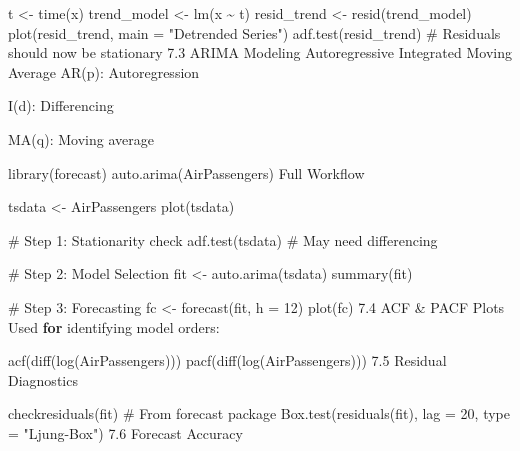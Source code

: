 \documentclass[
  letterpaper,
  DIV=11,
  numbers=noendperiod]{scrreprt}
\newenvironment{Shaded}{\begin{snugshade}}{\end{snugshade}}
\newcommand{\AttributeTok}[1]{\textcolor[rgb]{0.40,0.45,0.13}{#1}}
\newcommand{\CommentTok}[1]{\textcolor[rgb]{0.37,0.37,0.37}{#1}}
\newcommand{\ControlFlowTok}[1]{\textcolor[rgb]{0.00,0.23,0.31}{\textbf{#1}}}
\newcommand{\DecValTok}[1]{\textcolor[rgb]{0.68,0.00,0.00}{#1}}
\newcommand{\FloatTok}[1]{\textcolor[rgb]{0.68,0.00,0.00}{#1}}
\newcommand{\FunctionTok}[1]{\textcolor[rgb]{0.28,0.35,0.67}{#1}}
\newcommand{\NormalTok}[1]{\textcolor[rgb]{0.00,0.23,0.31}{#1}}
\newcommand{\OtherTok}[1]{\textcolor[rgb]{0.00,0.23,0.31}{#1}}
\newcommand{\SpecialCharTok}[1]{\textcolor[rgb]{0.37,0.37,0.37}{#1}}
\newcommand{\StringTok}[1]{\textcolor[rgb]{0.13,0.47,0.30}{#1}}
\begin{document}
{\begin{Shaded}
\begin{Highlighting}[]
\NormalTok{t }\OtherTok{\textless{}{-}} \FunctionTok{time}\NormalTok{(x)}
\NormalTok{trend\_model }\OtherTok{\textless{}{-}} \FunctionTok{lm}\NormalTok{(x }\SpecialCharTok{\textasciitilde{}}\NormalTok{ t)}
\NormalTok{resid\_trend }\OtherTok{\textless{}{-}} \FunctionTok{resid}\NormalTok{(trend\_model)}
\FunctionTok{plot}\NormalTok{(resid\_trend, }\AttributeTok{main =} \StringTok{"Detrended Series"}\NormalTok{)}
\FunctionTok{adf.test}\NormalTok{(resid\_trend)  }\CommentTok{\# Residuals should now be stationary}
\FloatTok{7.3}\NormalTok{ ARIMA Modeling}
\NormalTok{Autoregressive Integrated Moving Average}
\FunctionTok{AR}\NormalTok{(p)}\SpecialCharTok{:}\NormalTok{ Autoregression}

\FunctionTok{I}\NormalTok{(d)}\SpecialCharTok{:}\NormalTok{ Differencing}

\FunctionTok{MA}\NormalTok{(q)}\SpecialCharTok{:}\NormalTok{ Moving average}

\FunctionTok{library}\NormalTok{(forecast)}
\FunctionTok{auto.arima}\NormalTok{(AirPassengers)}
\NormalTok{Full Workflow}

\NormalTok{tsdata }\OtherTok{\textless{}{-}}\NormalTok{ AirPassengers}
\FunctionTok{plot}\NormalTok{(tsdata)}

\CommentTok{\# Step 1: Stationarity check}
\FunctionTok{adf.test}\NormalTok{(tsdata)  }\CommentTok{\# May need differencing}

\CommentTok{\# Step 2: Model Selection}
\NormalTok{fit }\OtherTok{\textless{}{-}} \FunctionTok{auto.arima}\NormalTok{(tsdata)}
\FunctionTok{summary}\NormalTok{(fit)}

\CommentTok{\# Step 3: Forecasting}
\NormalTok{fc }\OtherTok{\textless{}{-}} \FunctionTok{forecast}\NormalTok{(fit, }\AttributeTok{h =} \DecValTok{12}\NormalTok{)}
\FunctionTok{plot}\NormalTok{(fc)}
\FloatTok{7.4}\NormalTok{ ACF }\SpecialCharTok{\&}\NormalTok{ PACF Plots}
\NormalTok{Used }\ControlFlowTok{for}\NormalTok{ identifying model orders}\SpecialCharTok{:}

\FunctionTok{acf}\NormalTok{(}\FunctionTok{diff}\NormalTok{(}\FunctionTok{log}\NormalTok{(AirPassengers)))}
\FunctionTok{pacf}\NormalTok{(}\FunctionTok{diff}\NormalTok{(}\FunctionTok{log}\NormalTok{(AirPassengers)))}
\FloatTok{7.5}\NormalTok{ Residual Diagnostics}

\FunctionTok{checkresiduals}\NormalTok{(fit)  }\CommentTok{\# From forecast package}
\FunctionTok{Box.test}\NormalTok{(}\FunctionTok{residuals}\NormalTok{(fit), }\AttributeTok{lag =} \DecValTok{20}\NormalTok{, }\AttributeTok{type =} \StringTok{"Ljung{-}Box"}\NormalTok{)}
\FloatTok{7.6}\NormalTok{ Forecast Accuracy}


\end{Highlighting}
\end{Shaded}}
\end{document}
